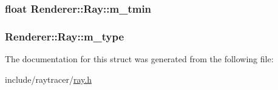 \subsubsection[{m\+\_\+tmin}]{\setlength{\rightskip}{0pt plus 5cm}float Renderer\+::\+Ray\+::m\+\_\+tmin}\label{structRenderer_1_1Ray_a30ab8d94432ef36f4b8615f5d48304f6}
\hypertarget{structRenderer_1_1Ray_a80f06b6cefceda2490e10441077e277b}{}
\subsubsection[{m\+\_\+type}]{ Renderer\+::\+Ray\+::m\+\_\+type}\label{structRenderer_1_1Ray_a80f06b6cefceda2490e10441077e277b}


The documentation for this struct was generated from the following file\+:\begin{DoxyCompactItemize}
\item 
include/raytracer/\hyperlink{ray_8h}{ray.\+h}\end{DoxyCompactItemize}
